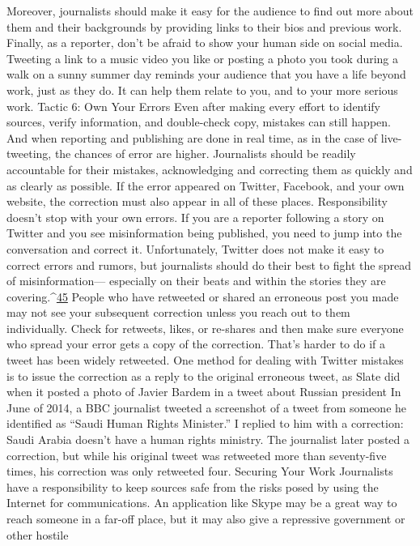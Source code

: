 Moreover, journalists should make it easy for the audience to find out more about them
and their backgrounds by providing links to their bios and previous work.
Finally, as a reporter, don’t be afraid to show your human side on social media. Tweeting
a link to a music video you like or posting a photo you took during a walk on a sunny
summer day reminds your audience that you have a life beyond work, just as they do. It
can help them relate to you, and to your more serious work.
Tactic 6: Own Your Errors
Even after making every effort to identify sources, verify information, and double-check
copy, mistakes can still happen. And when reporting and publishing are done in real time,
as in the case of live-tweeting, the chances of error are higher.
Journalists should be readily accountable for their mistakes, acknowledging and
correcting them as quickly and as clearly as possible. If the error appeared on Twitter,
Facebook, and your own website, the correction must also appear in all of these places.
Responsibility doesn’t stop with your own errors. If you are a reporter following a story
on Twitter and you see misinformation being published, you need to jump into the
conversation and correct it. Unfortunately, Twitter does not make it easy to correct errors
and rumors, but journalists should do their best to fight the spread of misinformation—
especially on their beats and within the stories they are covering.^{\href{#endnotes}{45}} People who have
retweeted or shared an erroneous post you made may not see your subsequent correction
unless you reach out to them individually. Check for retweets, likes, or re-shares and then
make sure everyone who spread your error gets a copy of the correction.
That’s harder to do if a tweet has been widely retweeted. One method for dealing with
Twitter mistakes is to issue the correction as a reply to the original erroneous tweet, as
Slate did when it posted a photo of Javier Bardem in a tweet about Russian president
In June of 2014, a BBC
journalist tweeted a
screenshot of a tweet
from someone he
identified as ``Saudi
Human Rights Minister.''
I replied to him with a
correction: Saudi Arabia
doesn’t have a human
rights ministry.
The journalist later
posted a correction, but
while his original tweet
was retweeted more than
seventy-five times, his
correction was only
retweeted four.
Securing Your Work
Journalists have a responsibility to keep sources safe from the risks posed by using the
Internet for communications. An application like Skype may be a great way to reach
someone in a far-off place, but it may also give a repressive government or other hostile
